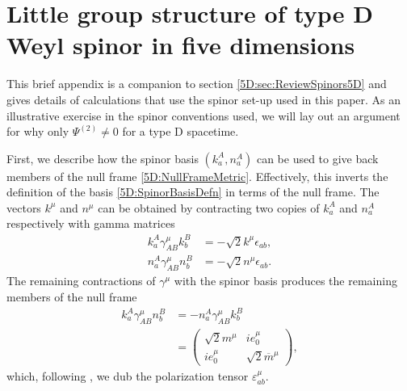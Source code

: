 \chapter{Little group structure of type D Weyl spinor in five dimensions} \label{5D:SpinorConventions} 
%
This brief appendix is a companion to section \ref{5D:sec:ReviewSpinors5D} and gives details of calculations that
use the spinor set-up used in this paper. As an illustrative exercise in the spinor conventions used, we will lay out an argument for why
only $\Psi^{(2)} \neq 0$ for a type D spacetime.

First, we describe how the spinor basis $(k^{A}_{a}, n^{A}_{a})$ can be used to give back members of the null
frame \eqref{5D:NullFrameMetric}. Effectively, this inverts the definition of the basis \eqref{5D:SpinorBasisDefn} in
terms of the null frame. The vectors $k^{\mu}$ and $n^{\mu}$ can be obtained by contracting two copies of
$k^{A}_{a}$ and $n^{A}_{a}$ respectively with gamma matrices
%
\begin{equation} \label{5D:GammaContractionsPartOne} 
    \begin{split}
        k_{a}^{A} \gamma^{\mu}_{AB} k_{b}^{B} &= - \sqrt{2} k^{\mu} \epsilon_{ab}, \\
        n_{a}^{A} \gamma^{\mu}_{AB} n_{b}^{B} &= - \sqrt{2} n^{\mu} \epsilon_{ab}.
    \end{split}
\end{equation}
%
The remaining contractions of $\gamma^{\mu}$ with the spinor basis produces the remaining members of the null frame
%
\begin{equation} \label{5D:GammaContractionsPartTwo} 
    \begin{split}
        k_{a}^{A} \gamma^{\mu}_{AB} n^{B}_{b} &= - n_{a}^{A} \gamma^{\mu}_{AB} k^{B}_{b} \\
                                              &= 
                                              \begin{pmatrix}
                                                  \sqrt{2} m^{\mu} & i e_{0}^{\mu} \\
                                                  i e_{0}^{\mu} & \sqrt{2}  \overline{m}^{\mu}
                                              \end{pmatrix},
    \end{split}
\end{equation}
which, following \cite{Monteiro:2018xev}, we dub the polarization tensor $\varepsilon^{\mu}_{ab}$.

